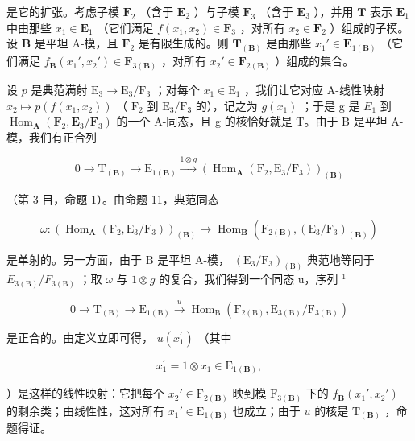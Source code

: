 是它的扩张。考虑子模 \(\mathbf{F}_2\) （含于 \(\mathbf{E}_2\) ）与子模 \(\mathbf{F}_3\) （含于 \(\mathbf{E}_3\) ），并用 \(\mathbf{T}\) 表示 \(\mathbf{E}_1\) 中由那些 \(x_1 \in \mathbf{E}_1\) （它们满足 \(f(x_1, x_2) \in \mathbf{F}_3\) ，对所有 \(x_2 \in \mathbf{F}_2\) ）组成的子模。设 \(\mathbf{B}\) 是平坦 A-模，且 \(\mathbf{F}_2\) 是有限生成的。则 \(\mathbf{T}_{(\mathbf{B})}\) 是由那些 \(x_1' \in \mathbf{E}_{1(\mathbf{B})}\) （它们满足 \(f_{\mathbf{B}}(x_1', x_2') \in \mathbf{F}_{3(\mathbf{B})}\) ，对所有 \(x_2' \in \mathbf{F}_{2(\mathbf{B})}\) ）组成的集合。

设 \(p\) 是典范满射 \(\mathrm{E}_3 \to \mathrm{E}_3 / \mathrm{F}_3\) ；对每个 \(x_1 \in \mathrm{E}_1\) ，我们让它对应 A-线性映射 \(x_2 \mapsto p(f(x_1, x_2))\) （ \(\mathrm{F}_2\) 到 \(\mathrm{E}_3 / \mathrm{F}_3\) 的），记之为 \(g(x_{1})\) ；于是 g 是 \(E_{1}\) 到 \(\operatorname{Hom}_{\mathbf{A}}(\mathbf{F}_{2}, \mathbf{E}_{3}/\mathbf{F}_{3})\) 的一个 A-同态，且 g 的核恰好就是 T。由于 B 是平坦 A-模，我们有正合列

\[
0 \longrightarrow \mathrm{T} _ {(\mathbf {B})} \longrightarrow \mathrm{E} _ {1 (\mathbf {B})} \stackrel {1 \otimes g} {\longrightarrow} \left(\operatorname{Hom} _ {\mathbf {A}} \left(\mathrm{F} _ {2}, \mathrm{E} _ {3} / \mathrm{F} _ {3}\right)\right) _ {(\mathbf {B})}
\]

（第 3 目，命题 1）。由命题 11，典范同态

\[
\omega : \left(\operatorname{Hom} _ {\mathbf {A}} (\mathrm{F} _ {2}, \mathrm{E} _ {3} / \mathrm{F} _ {3})\right) _ {(\mathbf {B})} \rightarrow \operatorname{Hom} _ {\mathbf {B}} (\mathrm{F} _ {2 (\mathbf {B})}, \left(\mathrm{E} _ {3} / \mathrm{F} _ {3}\right) _ {(\mathbf {B})})
\]

是单射的。另一方面，由于 B 是平坦 A-模， \((\mathrm{E}_{3}/\mathrm{F}_{3})_{(\mathrm{B})}\) 典范地等同于 \(E_{3(\mathrm{B})}/F_{3(\mathrm{B})}\) ；取 \(\omega\) 与 \(1 \otimes g\) 的复合，我们得到一个同态 u，序列 \(^{1}\)

\[
0 \longrightarrow \mathrm{T} _ {(\mathrm{B})} \longrightarrow \mathrm{E} _ {1 (\mathrm{B})} \stackrel {u} {\longrightarrow} \operatorname{Hom} _ {\mathrm{B}} \left(\mathrm{F} _ {2 (\mathrm{B})}, \mathrm{E} _ {3 (\mathrm{B})} / \mathrm{F} _ {3 (\mathrm{B})}\right)
\]

是正合的。由定义立即可得， \(u(x_{1}^{\prime})\) （其中

\[
x _ {1} ^ {\prime} = 1 \otimes x _ {1} \in \mathrm{E} _ {1 (\mathbf {B})},
\]

）是这样的线性映射：它把每个 \(x_2' \in \mathrm{F}_{2(\mathbf{B})}\) 映到模 \(\mathrm{F}_{3(\mathbf{B})}\) 下的 \(f_{\mathbf{B}}(x_1', x_2')\) 的剩余类；由线性性，这对所有 \(x_1' \in \mathrm{E}_{1(\mathbf{B})}\) 也成立；由于 \(u\) 的核是 \(\mathrm{T}_{(\mathbf{B})}\) ，命题得证。

